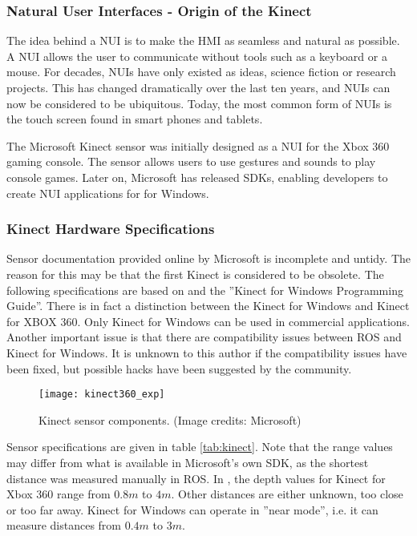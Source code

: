 \subsubsection{Natural User Interfaces - Origin of the Kinect}

The idea behind a \ac{NUI} is to make the \ac{HMI} as seamless and natural as possible. A \ac{NUI} allows the user to communicate without tools such as a keyboard or a mouse. For decades, \ac{NUI}s have only existed as ideas, science fiction or research projects. This has changed dramatically over the last ten years, and \ac{NUI}s can now be considered to be ubiquitous. Today, the most common form of \ac{NUI}s is the touch screen found in smart phones and tablets. 

The Microsoft Kinect sensor was initially designed as a \ac{NUI} for the Xbox 360 gaming console. The sensor allows users to use gestures and sounds to play console games. Later on, Microsoft has released SDKs, enabling developers to create \ac{NUI} applications for for Windows. 

\subsubsection{Kinect Hardware Specifications}

Sensor documentation provided online by Microsoft is incomplete and untidy. The reason for this may be that the first Kinect is considered to be obsolete. The following specifications are based on \cite{kinect_book} and the ''Kinect for Windows Programming Guide''\cite{kinect_guide}. There is in fact a distinction between the Kinect for Windows and Kinect for XBOX 360. Only Kinect for Windows can be used in commercial applications\cite{kinect_book}. Another important issue is that there are compatibility issues between \ac{ROS} and Kinect for Windows. It is unknown to this author if the compatibility issues have been fixed, but possible hacks have been suggested by the community\cite{kinect_discussion}\cite{kinect_hack}.

\begin{figure}[h]
    \centering
    \texttt{[image: kinect360\_exp]}
    \caption{Kinect sensor components. (Image credits: Microsoft\cite{kinect_guide})}
    \label{fig:kinect360_exp}
\end{figure}
Sensor specifications are given in table \ref{tab:kinect}. Note that the range values may differ from what is available in Microsoft's own SDK, as the shortest distance was measured manually in \ac{ROS}. In \cite{kinect_guide}, the depth values for Kinect for Xbox 360 range from $0.8 m$ to $4 m$. Other distances are either unknown, too close or too far away. Kinect for Windows can operate in ''near mode'', i.e. it can measure distances from $0.4 m$ to $3 m$.

